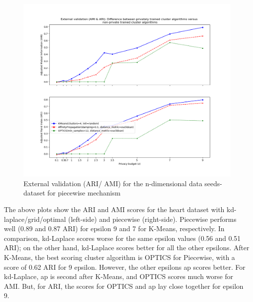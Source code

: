 \begin{figure}[H]
\begin{minipage}[c]{0.60\textwidth}
        \includegraphics[width=1\textwidth]{Results/nd-piecewise/seeds-dataset/ami-and-ari.png}
        \caption{External validation (ARI/ AMI) for the n-dimensional data seeds-dataset for piecewise mechanism}
        \label{fig:external-validation-seeds-dataset_comparison_nd-piecewise}
    \end{minipage}
\end{figure}
The above plots show the ARI and AMI scores for the heart dataset with kd-laplace/grid/optimal (left-side) and piecewise (right-side).
Piecewise performs well (0.89 and 0.87 ARI) for epsilon 9 and 7 for K-Means, respectively.
In comparison, kd-Laplace scores worse for the same epsilon values (0.56 and 0.51 ARI); on the other hand, kd-Laplace scores better for all the other epsilons.
After K-Means, the best scoring cluster algorithm is OPTICS for Piecewise, with a score of 0.62 ARI for 9 epsilon.
However, the other epsilons \gls{ap} scores better. For kd-Laplace, \gls{ap} is second after K-Means, and OPTICS scores much worse for AMI.
But, for ARI, the scores for OPTICS and \gls{ap} lay close together for epsilon 9.
